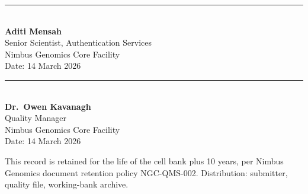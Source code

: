 \begin{center}
\begin{minipage}[t]{0.46\textwidth}
  \centering
  \vspace{1.4cm}
  \rule{5.2cm}{0.4pt}\\
  \textbf{Aditi Mensah}\\
  \small Senior Scientist, Authentication Services\\
  \small Nimbus Genomics Core Facility\\
  \small Date: 14 March 2026
\end{minipage}%
\hfill
\begin{minipage}[t]{0.46\textwidth}
  \centering
  \vspace{1.4cm}
  \rule{5.2cm}{0.4pt}\\
  \textbf{Dr.\ Owen Kavanagh}\\
  \small Quality Manager\\
  \small Nimbus Genomics Core Facility\\
  \small Date: 14 March 2026
\end{minipage}
\end{center}

\vspace{0.6em}
\begin{center}
  \small\color{labgray}
  This record is retained for the life of the cell bank plus 10 years, per Nimbus Genomics
  document retention policy NGC-QMS-002. Distribution: submitter, quality file, working-bank
  archive.
\end{center}



